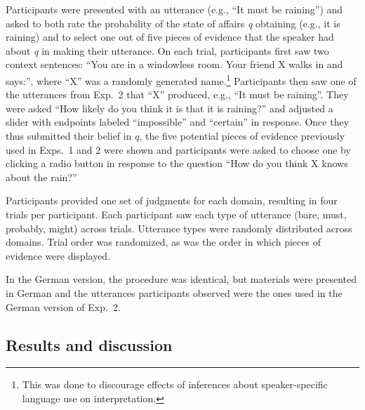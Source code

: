 \documentclass[11pt]{article}
\begin{document}
Participants were presented with an utterance (e.g., ``It must be raining'') and asked to both rate the probability of the state of affairs \emph{q} obtaining (e.g., it is raining) and to select one out of five pieces of evidence that the speaker had about \emph{q} in making their utterance. On each trial, participants first saw two context sentences: ``You are in a windowless room. Your friend X walks in and says:'', where ``X'' was a randomly generated name.\footnote{This was done to discourage effects of inferences about speaker-specific language use on interpretation.} Participants then saw one of the utterances from Exp.~2 that ``X'' produced, e.g., ``It must be raining''. They were asked ``How likely do you think it is that it is raining?'' and adjusted a slider with endpoints labeled ``impossible'' and ``certain'' in response. Once they thus submitted their belief in $q$, the five potential pieces of evidence previously used in Exps.~1 and 2 were shown and participants were asked to choose one by clicking a radio button in response to the question ``How do you think X knows about the rain?'' 

Participants provided one set of judgments for each domain, resulting in four trials per participant. Each participant saw each type of utterance (bare, must, probably, might)  across trials. Utterance types were randomly distributed across domains. Trial order was randomized, as was the order in which pieces of evidence were displayed.

In the German version, the procedure was identical, but materials were presented in German and the utterances participants observed were the ones used in the German version of Exp.~2.

\subsection{Results and discussion}
\end{document}
